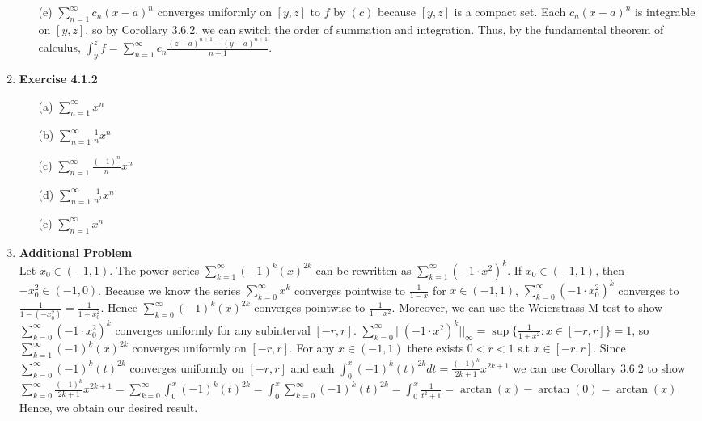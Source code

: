 \documentclass[10pt]{article}
\begin{document}
\begin{enumerate}[label=Problem \arabic*.]
\begin{itemize}
    \item [(e)] $\displaystyle\sum_{n=1}^{\infty}c_n(x-a)^n$ converges uniformly on $[y,z]$ to $f$ by $(c)$ because $[y,z]$ is a compact set. Each $c_n(x-a)^n$ is integrable on $[y,z]$, so by Corollary 3.6.2, we can switch the order of summation and integration. 
    Thus, by the fundamental theorem of calculus, $\displaystyle\int_{y}^{z}f=\sum_{n=1}^{\infty}c_n\frac{(z-a)^{n+1}-(y-a)^{n+1}}{n+1}$.
\end{itemize}  
\item \textbf{Exercise 4.1.2}
\begin{itemize}
    \item [(a)] $\displaystyle\sum_{n=1}^{\infty}x^{n}$
    \item [(b)] $\displaystyle\sum_{n=1}^{\infty}\frac{1}{n}x^n$
    \item [(c)] $\displaystyle\sum_{n=1}^{\infty}\frac{(-1)^n}{n}x^n$
    \item [(d)] $\displaystyle\sum_{n=1}^{\infty}\frac{1}{n^2}x^n$
    \item [(e)] $\displaystyle\sum_{n=1}^{\infty}x^{n}$
\end{itemize}
\item \textbf{Additional Problem}\\
Let $x_0\in(-1,1)$. The power series $\displaystyle\sum_{k=1}^{\infty}(-1)^k(x)^{2k}$ can be rewritten as $\displaystyle\sum_{k=1}^{\infty}(-1\cdot x^2)^{k}$.
If $x_0\in(-1,1)$, then $-x_{0}^2\in(-1,0)$. 
Because we know the series $\displaystyle\sum_{k=0}^{\infty}x^{k}$ converges pointwise to $\frac{1}{1-x}$ for $x\in(-1,1)$, $\displaystyle\sum_{k=0}^{\infty}(-1\cdot x_{0}^2)^{k}$ converges to $\frac{1}{1-(-x_{0}^2)}=\frac{1}{1+x_{0}^2}$.
Hence $\displaystyle\sum_{k=0}^{\infty}(-1)^k(x)^{2k}$ converges pointwise to $\frac{1}{1+x^2}$.
Moreover, we can use the Weierstrass M-test to show $\displaystyle\sum_{k=0}^{\infty}(-1\cdot x_{0}^2)^{k}$ converges uniformly for any subinterval $[-r,r]$. $\displaystyle\sum_{k=0}^{\infty}||(-1\cdot x^2)^{k}||_\infty=\sup\{\frac{1}{1+x^2}:x\in[-r,r]\}=1$, so $\displaystyle\sum_{k=1}^{\infty}(-1)^k(x)^{2k}$ converges uniformly on $[-r,r]$. 
For any $x\in(-1,1)$ there exists $0<r<1$ s.t $x\in[-r,r]$. Since $\sum_{k=0}^{\infty}(-1)^k(t)^{2k}$ converges uniformly on $[-r,r]$ and each $\int_{0}^{x}(-1)^k(t)^{2k}dt=\frac{(-1)^k}{2k+1}x^{2k+1}$ we can use Corollary 3.6.2 to show $\sum_{k=0}^{\infty}\frac{(-1)^k}{2k+1}x^{2k+1}=\sum_{k=0}^{\infty}\int_{0}^{x}(-1)^k(t)^{2k}=\int_{0}^{x}\sum_{k=0}^{\infty}(-1)^k(t)^{2k}=\int_{0}^{x}\frac{1}{t^2+1}=\arctan(x)-\arctan(0)=\arctan(x)$ Hence, we obtain our desired result.
\end{enumerate}
\end{document}

